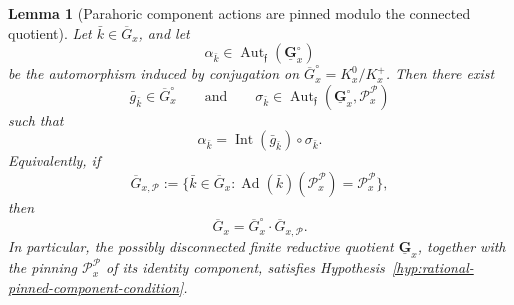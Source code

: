 \documentclass{amsart}
\theoremstyle{plain}
\numberwithin{equation}{section}
\newtheorem{lemma}[theorem]{Lemma}
\theoremstyle{definition}
\newcommand{\Ad}{\operatorname{Ad}}
\newcommand{\cP}{\mathcal{P}}
\newcommand{\ff}{\mathfrak{f}}
\newcommand{\Aut}{\operatorname{Aut}}
\begin{document}
\begin{lemma}[Parahoric component actions are pinned modulo the connected quotient]
\label{lem:parahoric-component-action-pinned}
Let \(\bar k\in\overline G_x\), and let
\[
        \alpha_{\bar k}\in\Aut_\ff(\underline{\mathbf G}_x^\circ)
\]
be the automorphism induced by conjugation on
\(\overline G_x^\circ=K_x^0/K_x^+\).  Then there exist
\[
        \bar g_{\bar k}\in \overline G_x^\circ
        \qquad\text{and}\qquad
        \sigma_{\bar k}\in
        \Aut_\ff(\underline{\mathbf G}_x^\circ,\cP_x^{\cP})
\]
such that
\[
        \alpha_{\bar k}
        =
        \operatorname{Int}(\bar g_{\bar k})\circ\sigma_{\bar k}.
\]
Equivalently, if
\[
        \overline G_{x,\cP}
        :=
        \{\bar k\in\overline G_x:
        \Ad(\bar k)(\cP_x^{\cP})=
        \cP_x^{\cP}\},
\]
then
\[
        \overline G_x
        =
        \overline G_x^\circ\cdot \overline G_{x,\cP}.
\]
In particular, the possibly disconnected finite reductive quotient
\(\underline{\mathbf G}_x\), together with the pinning
\(\cP_x^{\cP}\) of its identity component, satisfies
Hypothesis~\ref{hyp:rational-pinned-component-condition}.
\end{lemma}
\end{document}
